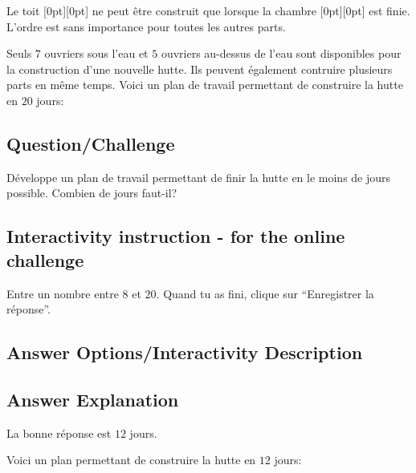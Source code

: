 \documentclass[a4paper,11pt]{report}
\newcommand{\taskGraphicsFolder}{..}
\begin{document}
Le toit \raisebox{-0.5ex}[0pt][0pt]{} ne peut être construit que lorsque la chambre \raisebox{-0.5ex}[0pt][0pt]{} est finie. L’ordre est sans importance pour toutes les autres parts.

Seuls $7$ ouvriers sous l’eau et $5$ ouvriers au-dessus de l’eau sont disponibles pour la construction d’une nouvelle hutte. Ils peuvent également contruire plusieurs parts en même temps. Voici un plan de travail permettant de construire la hutte en $20$ jours:

{\centering%
\par}

{\em

\subsection*{Question/Challenge}

Développe un plan de travail permettant de finir la hutte en le moins de jours possible. Combien de jours faut-il?

}
\subsection*{Interactivity instruction - for the online challenge}

Entre un nombre entre $8$ et $20$. Quand tu as fini, clique sur “Enregistrer la réponse”.

\begingroup
\renewcommand{\arraystretch}{1.5}
\subsection*{Answer Options/Interactivity Description}



\endgroup

\subsection*{Answer Explanation}

La bonne réponse est $12$ jours.

Voici un plan permettant de construire la hutte en $12$ jours:

{\centering%
\par}
\end{document}
